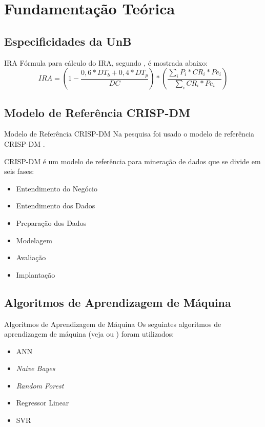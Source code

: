 \section{Fundamentação Teórica}

\subsection{Especificidades da UnB}
\begin{frame}{IRA}
    Fórmula para cálculo do IRA, segundo \cite{manual_calouro}, é mostrada abaixo: 
    \begin{equation}
        IRA = (1 - \frac{0,6 * DT_b + 0,4 * DT_p}{DC}) * 
        (\frac{\sum_{i}P_i * CR_i * Pe_i}{\sum_{i} CR_i * Pe_i})
    \end{equation}
\end{frame}

\subsection{Modelo de Referência CRISP-DM}
\begin{frame}{Modelo de Referência CRISP-DM}
    Na pesquisa foi usado o modelo de referência CRISP-DM \cite{crispdm}. 
    
    \vspace{0.5cm}

    CRISP-DM é um modelo de referência para mineração de dados que se divide em seis
    fases: 
    \begin{itemize}
        \item Entendimento do Negócio
        \item Entendimento dos Dados
        \item Preparação dos Dados
        \item Modelagem
        \item Avaliação 
        \item Implantação
    \end{itemize}
\end{frame}

\subsection{Algoritmos de Aprendizagem de Máquina}
\begin{frame}{Algoritmos de Aprendizagem de Máquina}
    Os seguintes algoritmos de aprendizagem de máquina (veja \cite{ml_book} ou
    \cite{ml_second_book}) foram utilizados: 
    \begin{itemize}
        \item ANN
        \item \textit{Naive Bayes}
        \item \textit{Random Forest}
        \item Regressor Linear
        \item SVR
    \end{itemize}
\end{frame}

